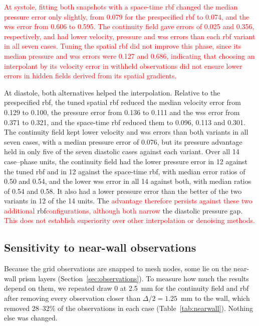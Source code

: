 \documentclass[12pt,a4paper]{article}
\newcommand{\WSS}{\ac{wss}\xspace}
\newcommand{\RBF}{\ac{rbf}\xspace}
\theoremstyle{definition}
\numberwithin{equation}{section}
\newcommand{\revision}[1]{\textcolor{red}{#1}}
\begin{document}
\revision{At systole, fitting both snapshots with a space-time \RBF changed the median pressure error only slightly, from 0.079 for the prespecified \RBF to 0.074, and the \WSS error from 0.606 to 0.595. The continuity field gave errors of 0.025 and 0.356, respectively, and had lower velocity, pressure and \WSS errors than each \RBF variant in all seven cases. Tuning the spatial \RBF did not improve this phase, since its median pressure and \WSS errors were 0.127 and 0.686, indicating that choosing an interpolant by its velocity error in withheld observations did not ensure lower errors in hidden fields derived from its spatial gradients.}

At diastole, both alternatives helped the interpolation. Relative to the prespecified \RBF, the tuned spatial \RBF reduced the median velocity error from 0.129 to 0.100, the pressure error from 0.136 to 0.111 and the \WSS error from 0.371 to 0.321, and the space-time \RBF reduced them to 0.096, 0.113 and 0.301. The continuity field kept lower velocity and \WSS errors than both variants in all seven cases, with a median pressure error of 0.076, but its pressure advantage held in only five of the seven diastolic cases against each variant. Over all 14 case--phase units, the continuity field had the lower pressure error in 12 against the tuned \RBF and in 12 against the space-time \RBF, with median error ratios of 0.50 and 0.54, and the lower \WSS error in all 14 against both, with median ratios of 0.54 and 0.58. It also had a lower pressure error than the better of the two variants in 12 of the 14 units. The   \revision{advantage therefore persists against these two additional } \RBF   \revision{configurations, although both narrow } the diastolic pressure gap.  \revision{This does not establish superiority over other interpolation or denoising methods.
}



\subsection{Sensitivity to near-wall observations}
\label{sec:nearwall}
Because the grid observations are snapped to mesh nodes, some lie on the near-wall prism layers (Section~\ref{sec:observations}). To measure how much the results depend on them, we repeated draw 0 at 2.5~mm for the continuity field and \RBF after removing every observation closer than $\Delta/2=1.25$~mm to the wall, which removed 28--32\% of the observations in each case (Table~\ref{tab:nearwall}). Nothing else was changed.
\end{document}
